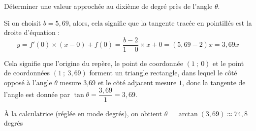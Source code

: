 \documentclass{cornouaille}
\begin{document}
\begin{exercice}
\begin{enumerate}
Déterminer une valeur approchée au dixième de degré près de l'angle $\theta$.

\begin{solution}
Si on choisit $b = 5,69$, alors, cela signifie que la tangente tracée en pointillés est la droite d'équation : 
$$y = f'(0) \times (x - 0) + f(0) = \dfrac{b - 2}{1 - 0} \times x + 0 = (5,69 - 2)x = 3,69x$$
		
Cela signifie que l'origine du repère, le point de coordonnée $(1~;~0)$ et le point de coordonnées $(1~;~3,69)$ forment un triangle rectangle, dans lequel le côté opposé à l'angle $\theta$ mesure 3,69 et le côté adjacent mesure $1$, donc la tangente de l'angle est donnée par $\tan \theta = \dfrac{3,69}{1} = 3,69$.
		
À la calculatrice (réglée en mode degrés), on obtient $\theta = \arctan(3,69) \approx 74,8$ degrés
\end{solution}
\end{enumerate}
\end{exercice}
\end{document}
